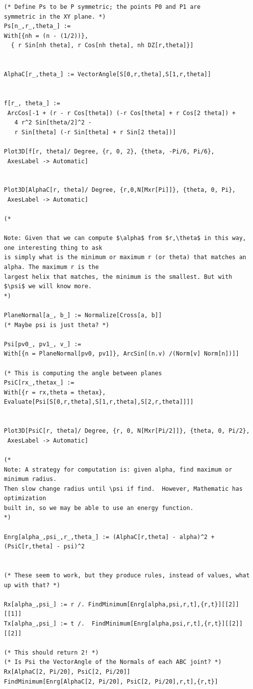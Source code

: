 \documentclass[11pt]{article}
\begin{document}
{\begin{verbatim}
(* Define Ps to be P symmetric; the points P0 and P1 are
symmetric in the XY plane. *)
Ps[n_,r_,theta_] :=
With[{nh = (n - (1/2))},
  { r Sin[nh theta], r Cos[nh theta], nh DZ[r,theta]}]


AlphaC[r_,theta_] := VectorAngle[S[0,r,theta],S[1,r,theta]]


f[r_, theta_] := 
 ArcCos[-1 + (r - r Cos[theta]) (-r Cos[theta] + r Cos[2 theta]) + 
   4 r^2 Sin[theta/2]^2 - 
   r Sin[theta] (-r Sin[theta] + r Sin[2 theta])]

Plot3D[f[r, theta]/ Degree, {r, 0, 2}, {theta, -Pi/6, Pi/6}, 
 AxesLabel -> Automatic]


Plot3D[AlphaC[r, theta]/ Degree, {r,0,N[Mxr[Pi]]}, {theta, 0, Pi}, 
 AxesLabel -> Automatic]

(*

Note: Given that we can compute $\alpha$ from $r,\theta$ in this way, one interesting thing to ask
is simply what is the minimum or maximum r (or theta) that matches an alpha. The maximum r is the
largest helix that matches, the minimum is the smallest. But with $\psi$ we will know more.
*)

PlaneNormal[a_, b_] := Normalize[Cross[a, b]]
(* Maybe psi is just theta? *)

Psi[pv0_, pv1_, v_] := 
With[{n = PlaneNormal[pv0, pv1]}, ArcSin[(n.v) /(Norm[v] Norm[n])]]

(* This is computing the angle between planes
PsiC[rx_,thetax_] := 
With[{r = rx,theta = thetax}, Evaluate[Psi[S[0,r,theta],S[1,r,theta],S[2,r,theta]]]]


Plot3D[PsiC[r, theta]/ Degree, {r, 0, N[Mxr[Pi/2]]}, {theta, 0, Pi/2}, 
 AxesLabel -> Automatic]

(*
Note: A strategy for computation is: given alpha, find maximum or minimum radius.
Then slow change radius until \psi if find.  However, Mathematic has optimization
built in, so we may be able to use an energy function.
*)

Enrg[alpha_,psi_,r_,theta_] := (AlphaC[r,theta] - alpha)^2 + (PsiC[r,theta] - psi)^2


(* These seem to work, but they produce rules, instead of values, what up with that? *)

Rx[alpha_,psi_] := r /. FindMinimum[Enrg[alpha,psi,r,t],{r,t}][[2]][[1]]
Tx[alpha_,psi_] := t /.  FindMinimum[Enrg[alpha,psi,r,t],{r,t}][[2]][[2]]

(* This should return 2! *)
(* Is Psi the VectorAngle of the Normals of each ABC joint? *)
Rx[AlphaC[2, Pi/20], PsiC[2, Pi/20]]
FindMinimum[Enrg[AlphaC[2, Pi/20], PsiC[2, Pi/20],r,t],{r,t}]


\end{verbatim}}
\end{document}
